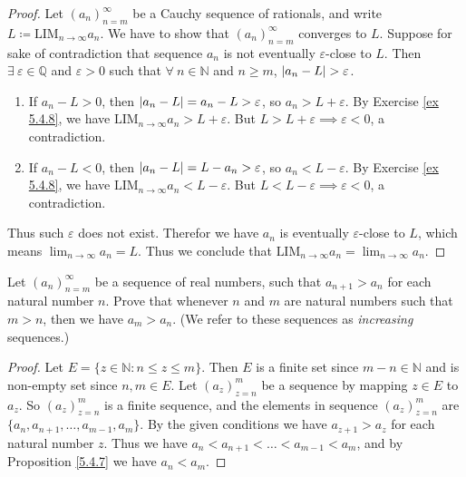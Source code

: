 \begin{proof}
Let \((a_n)_{n = m}^\infty\) be a Cauchy sequence of rationals, and write \(L \coloneqq \text{LIM}_{n \to \infty} a_n\).
We have to show that \((a_n)_{n = m}^\infty\) converges to \(L\).
Suppose for sake of contradiction that sequence \(a_n\) is not eventually \(\varepsilon\)-close to \(L\).
Then \(\exists\ \varepsilon \in \mathds{Q}\) and \(\varepsilon > 0\) such that \(\forall\ n \in \mathds{N}\) and \(n \geq m\), \(\abs*{a_n - L} > \varepsilon\).
\begin{enumerate}
    \item If \(a_n - L > 0\), then \(\abs*{a_n - L} = a_n - L > \varepsilon\), so \(a_n > L + \varepsilon\).
    By Exercise \ref{ex 5.4.8}, we have \(\text{LIM}_{n \to \infty} a_n > L + \varepsilon\).
    But \(L > L + \varepsilon \implies \varepsilon < 0\), a contradiction.
    \item If \(a_n - L < 0\), then \(\abs*{a_n - L} = L - a_n > \varepsilon\), so \(a_n < L - \varepsilon\).
    By Exercise \ref{ex 5.4.8}, we have \(\text{LIM}_{n \to \infty} a_n < L - \varepsilon\).
    But \(L < L - \varepsilon \implies \varepsilon < 0\), a contradiction.
\end{enumerate}
Thus such \(\varepsilon\) does not exist.
Therefor we have \(a_n\) is eventually \(\varepsilon\)-close to \(L\), which means \(\lim_{n \to \infty} a_n = L\).
Thus we conclude that \(\text{LIM}_{n \to \infty} a_n = \lim_{n \to \infty} a_n\).
\end{proof}

\exercisesection

\begin{exercise}\label{ex 6.1.1}
Let \((a_n)_{n = m}^\infty\) be a sequence of real numbers, such that \(a_{n + 1} > a_n\) for each natural number \(n\).
Prove that whenever \(n\) and \(m\) are natural numbers such that \(m > n\), then we have \(a_m > a_n\).
(We refer to these sequences as \emph{increasing} sequences.)
\end{exercise}

\begin{proof}
Let \(E = \{z \in \mathds{N} : n \leq z \leq m\}\).
Then \(E\) is a finite set since \(m - n \in \mathds{N}\) and is non-empty set since \(n, m \in E\).
Let \((a_z)_{z = n}^m\) be a sequence by mapping \(z \in E\) to \(a_z\).
So \((a_z)_{z = n}^m\) is a finite sequence, and the elements in sequence \((a_z)_{z = n}^m\) are \(\{a_n, a_{n + 1}, \dots, a_{m - 1}, a_m\}\).
By the given conditions we have \(a_{z + 1} > a_z\) for each natural number \(z\).
Thus we have \(a_n < a_{n + 1} < \dots < a_{m - 1} < a_m\), and by Proposition \ref{5.4.7} we have \(a_n < a_m\).
\end{proof}

